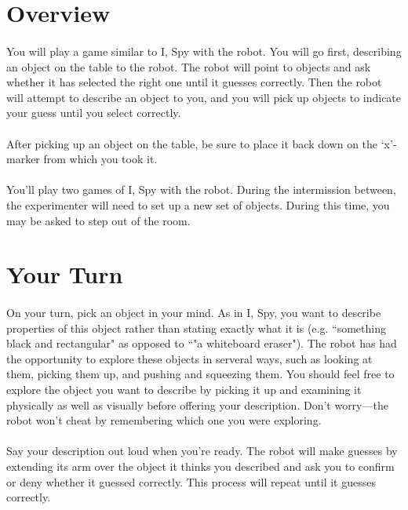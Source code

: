 \documentclass{article}
\begin{document}
\section{Overview}

\paragraph{} You will play a game similar to I, Spy with the robot. You will go first, describing an object on the table to the robot. The robot will point to objects and ask whether it has selected the right one until it guesses correctly. Then the robot will attempt to describe an object to you, and you will pick up objects to indicate your guess until you select correctly.

\paragraph{} After picking up an object on the table, be sure to place it back down on the `x'-marker from which you took it.

\paragraph{} You'll play two games of I, Spy with the robot. During the intermission between, the experimenter will need to set up a new set of objects. During this time, you may be asked to step out of the room.

\section{Your Turn}

\paragraph{} On your turn, pick an object in your mind. As in I, Spy, you want to describe properties of this object rather than stating exactly what it is (e.g. ``something black and rectangular" as opposed to ``"a whiteboard eraser"). The robot has had the opportunity to explore these objects in serveral ways, such as looking at them, picking them up, and pushing and squeezing them. You should feel free to explore the object you want to describe by picking it up and examining it physically as well as visually before offering your description. Don't worry---the robot won't cheat by remembering which one you were exploring.

\paragraph{} Say your description out loud when you're ready. The robot will make guesses by extending its arm over the object it thinks you described and ask you to confirm or deny whether it guessed correctly. This process will repeat until it guesses correctly.
\end{document}
